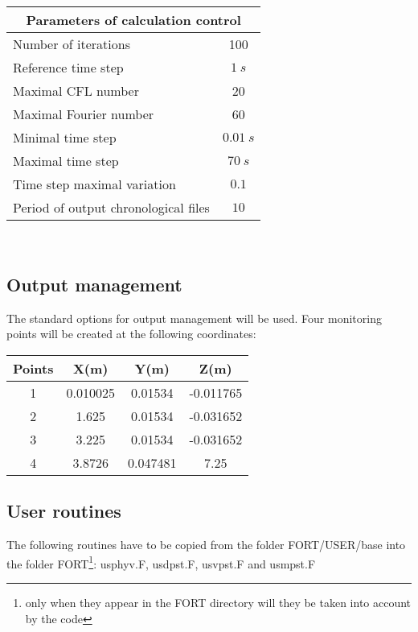 \begin{center}
\begin{tabular}{|l|c|}
\hline
\multicolumn{2}{|c|}{Parameters of calculation control} \\
\hline
Number of iterations & 100 \\
\hline
Reference time step & $1\ s $ \\
\hline
Maximal CFL number & 20 \\
\hline
Maximal Fourier number & 60 \\
\hline
Minimal time step & $0.01\ s$ \\
\hline
Maximal time step & $70\ s$ \\
\hline
Time step maximal variation & $0.1$ \\ 
\hline
Period of output chronological files & $10$ \\
\hline
\end{tabular}\\
\end{center}



	\subsection{Output management}
The standard options for output management will be used. Four monitoring points
will be created at the following coordinates:

\begin{center}
\begin{tabular}{|c|c|c|c|}
\hline
Points & X(m) & Y(m) & Z(m)\\
\hline
1 & 0.010025 & 0.01534 & -0.011765 \\
\hline
2 & 1.625 & 0.01534 & -0.031652 \\
\hline
3 & 3.225 & 0.01534 & -0.031652 \\
\hline
4 & 3.8726 & 0.047481 & 7.25 \\
\hline
\end{tabular}
\end{center}



	\subsection{User routines}

The following routines have to be copied from the folder FORT/USER/base into the
folder FORT\footnote{only when they appear in the FORT directory will they be
taken into account by the code}: usphyv.F, usdpst.F, usvpst.F and usmpst.F

